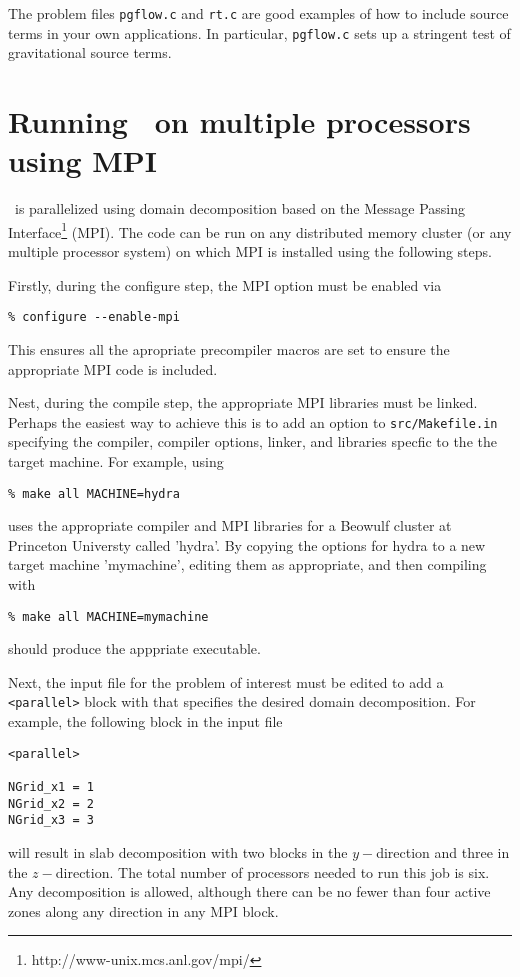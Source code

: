 The problem files {\tt pgflow.c} and {\tt rt.c} are good examples
of how to include source terms in your own applications.  In particular,
{\tt pgflow.c} sets up a stringent test of gravitational source terms.

\section{Running \ath\ on multiple processors using MPI}

\ath\ is parallelized using domain decomposition based on the
Message Passing Interface\footnote{http://www-unix.mcs.anl.gov/mpi/} (MPI).
The code can be run on any distributed memory cluster (or any multiple
processor system) on which MPI is installed using the following steps.

Firstly, during the configure step, the MPI option must be enabled via
\begin{verbatim}
% configure --enable-mpi
\end{verbatim}
This ensures all the apropriate precompiler macros are set to ensure the
appropriate MPI code is included.

Nest, during the compile step, the appropriate MPI libraries must be
linked.  Perhaps the easiest way to achieve this is to add an option
to {\tt src/Makefile.in} specifying the compiler, compiler options, linker,
and libraries specfic to the the target machine.  For example, using
\begin{verbatim}
% make all MACHINE=hydra
\end{verbatim}
uses the appropriate compiler and MPI libraries for a Beowulf cluster
at Princeton Universty called 'hydra'.  By copying the options for hydra
to a new target machine 'mymachine', editing them as appropriate, and
then compiling with
\begin{verbatim}
% make all MACHINE=mymachine
\end{verbatim}
should produce the apppriate executable.

Next, the input file for the problem of interest must be edited to add
a {\tt <parallel>} block with that specifies the desired domain decomposition.
For example, the following block in the input file
\begin{verbatim}
<parallel>

NGrid_x1 = 1
NGrid_x2 = 2
NGrid_x3 = 3
\end{verbatim}
will result in slab decomposition with two blocks in the $y-$direction and
three in the $z-$direction.  The total number of processors needed to run this
job is six.  Any decomposition is allowed, although there can be no fewer than
four active zones along any direction in any MPI block. 

